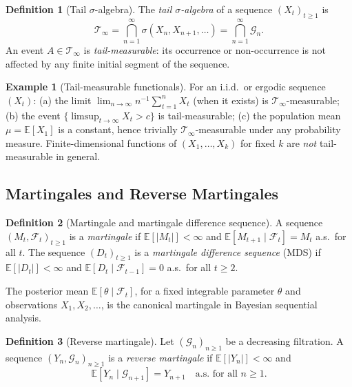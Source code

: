 \documentclass[bj,authoryear]{imsart}
\theoremstyle{plain}
\theoremstyle{definition}
\newtheorem{definition}{Definition}[section]
\newtheorem{example}{Example}[section]
\newcommand{\E}{\mathbb{E}}
\newcommand{\F}{\mathcal{F}}
\newcommand{\G}{\mathcal{G}}
\newcommand{\Tsig}{\mathcal{T}_\infty}
\newcommand{\abs}[1]{\left| #1 \right|}
\newcommand{\given}{\mid}
\begin{document}
\begin{definition}[Tail $\sigma$-algebra]
\label{def:tail}
  The \emph{tail $\sigma$-algebra} of a sequence $(X_t)_{t\geq 1}$ is
  \[
    \Tsig = \bigcap_{n=1}^\infty \sigma(X_n, X_{n+1}, \ldots)
           = \bigcap_{n=1}^\infty \G_n.
  \]
  An event $A \in \Tsig$ is \emph{tail-measurable}: its occurrence or
  non-occurrence is not affected by any finite initial segment of the sequence.
\end{definition}

\begin{example}[Tail-measurable functionals]
  For an i.i.d.\ or ergodic sequence $(X_t)$:
  (a) the limit $\lim_{n\to\infty} n^{-1}\sum_{t=1}^n X_t$ (when it exists)
      is $\Tsig$-measurable;
  (b) the event $\{\limsup_{t\to\infty} X_t > c\}$ is tail-measurable;
  (c) the population mean $\mu = \E[X_1]$ is a constant, hence trivially
      $\Tsig$-measurable under any probability measure.
  Finite-dimensional functions of $(X_1,\ldots,X_k)$ for fixed $k$ are
  \emph{not} tail-measurable in general.
\end{example}

\subsection{Martingales and Reverse Martingales}

\begin{definition}[Martingale and martingale difference sequence]
\label{def:martingale}
  A sequence $(M_t, \F_t)_{t\geq 1}$ is a \emph{martingale} if
  $\E[\abs{M_t}] < \infty$ and $\E[M_{t+1}\given\F_t] = M_t$ a.s.\ for all $t$.
  The sequence $(D_t)_{t\geq 1}$ is a \emph{martingale difference sequence} (MDS)
  if $\E[\abs{D_t}] < \infty$ and $\E[D_t\given\F_{t-1}] = 0$ a.s.\ for all $t\geq 2$.
\end{definition}

The posterior mean $\E[\theta\given\F_t]$, for a fixed integrable parameter
$\theta$ and observations $X_1, X_2, \ldots$, is the canonical martingale in
Bayesian sequential analysis.

\begin{definition}[Reverse martingale]
\label{def:reverse-mg}
  Let $(\G_n)_{n\geq 1}$ be a decreasing filtration.
  A sequence $(Y_n, \G_n)_{n\geq 1}$ is a \emph{reverse martingale} if
  $\E[\abs{Y_n}] < \infty$ and
  \[
    \E[Y_n \given \G_{n+1}] = Y_{n+1} \quad \text{a.s.\ for all } n\geq 1.
  \]
\end{definition}
\end{document}
